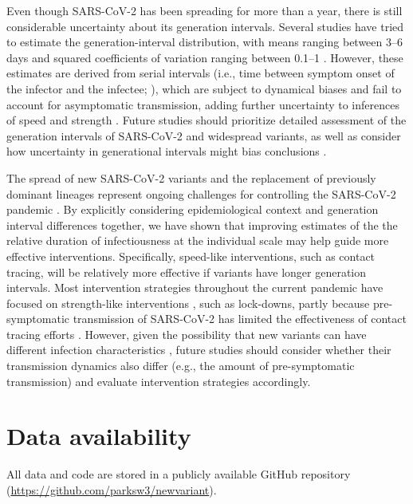 \documentclass[12pt]{article}
\begin{document}
Even though SARS-CoV-2 has been spreading for more than a year, there is still considerable uncertainty about its generation intervals.
Several studies have tried to estimate the generation-interval distribution, with means ranging between 3--6 days and squared coefficients of variation ranging between 0.1--1 \citep{ferretti2020quantifying,Ferretti2020timing,ganyani2020estimating,knight2020estimating}.
However, these estimates are derived from serial intervals (i.e., time between symptom onset of the infector and the infectee; \cite{svensson2007note}), which are subject to dynamical biases \citep{park2021forward} and fail to account for asymptomatic transmission, adding further uncertainty to inferences of speed and strength \citep{park2020time}.
Future studies should prioritize detailed assessment of the generation intervals of SARS-CoV-2 and widespread variants, as well as consider how uncertainty in generational intervals might bias conclusions \citep{doi:10.1098/rsif.2020.0144,ali2020serial,gostic2020practical}.

The spread of new SARS-CoV-2 variants and the replacement of previously dominant lineages represent ongoing challenges for controlling the SARS-CoV-2 pandemic \citep{abdool2021new,fontanet2021sars,walensky2021sars}.  
By explicitly considering epidemiological context and generation interval differences together, we have shown that improving estimates of the the relative duration of infectiousness at the individual scale may help guide more effective interventions. 
Specifically, speed-like interventions, such as contact tracing, will be relatively more effective if variants have longer generation intervals.
Most intervention strategies throughout the current pandemic have focused on strength-like interventions \citep{flaxman2020Rt}, such as lock-downs, partly because pre-symptomatic transmission of SARS-CoV-2 has limited the effectiveness of contact tracing efforts \citep{hellewell2020feasibility}.
However, given the possibility that new variants can have different infection characteristics \citep{kissler2021densely}, future studies should consider whether their transmission dynamics also differ (e.g., the amount of pre-symptomatic transmission) and evaluate intervention strategies accordingly.

\section*{Data availability}

All data and code are stored in a publicly available GitHub repository (\url{https://github.com/parksw3/newvariant}).
\end{document}
